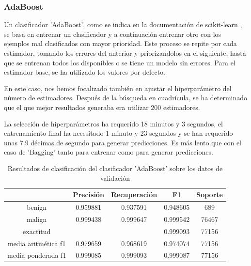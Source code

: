\subsubsection{AdaBoost} %

Un clasificador 'AdaBoost', como se indica en la documentación de scikit-learn \cite{sklearnadaboost}, se basa en entrenar un clasificador y a continuación entrenar otro con los ejemplos mal clasificados con mayor prioridad. Este proceso se repite por cada estimador, tomando los errores del anterior y priorizandolos en el siguiente, hasta que se entrenan todos los disponibles o se tiene un modelo sin errores. Para el estimador base, se ha utilizado los valores por defecto.

En este caso, nos hemos focalizado también en ajustar el hiperparámetro del número de estimadores. Después de la búsqueda en cuadrícula, se ha determinado que el que mejor resultados generaba era utilizar 200 estimadores.

La selección de hiperparámetros ha requerido 18 minutos y 3 segundos, el entrenamiento final ha necesitado 1 minuto y 23 segundos y se han requerido unas 7.9 décimas de segundo para generar predicciones. Es más lento que con el caso de 'Bagging' tanto para entrenar como para generar predicciones.

\begin{table}[H]
    \begin{center}
        \begin{tabular}{|c | c c c | c |} 
            \hline
            & \textbf{Precisión} & \textbf{Recuperación} & \textbf{F1}  & \textbf{Soporte} \\
            \hline
            benign               & 0.959881 & 0.937591 & 0.948605  &   689 \\
            malign               & 0.999438 & 0.999647 & 0.999542  & 76467 \\
            \hline
            exactitud            &          &          & 0.999093  & 77156 \\
            media aritmética f1  & 0.979659 & 0.968619 & 0.974074  & 77156 \\
            media ponderada f1   & 0.999085 & 0.999093 & 0.999087  & 77156 \\
            \hline
        \end{tabular}
    \end{center}
    \caption{Resultados de clasificación del clasificador 'AdaBoost' sobre los datos de validación}
    \label{table:adaboostresults}
\end{table}


